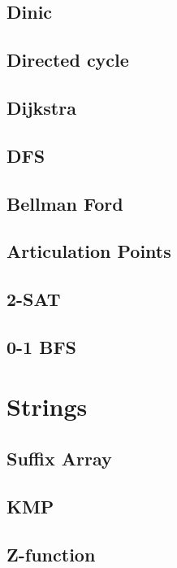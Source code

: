 \documentclass[10pt]{extarticle}
\begin{document}
\begin{multicols*}{3}
    \subsection{Dinic}
    
    \subsection{Directed cycle}
    
    \subsection{Dijkstra}
    
    \subsection{DFS}
    
    \subsection{Bellman Ford}
    
    \subsection{Articulation Points}
    
    \subsection{2-SAT}
    
    \subsection{0-1 BFS}
    

\section{Strings}

\subsection{Suffix Array}

\subsection{KMP}

\subsection{Z-function}



\end{multicols*}
\end{document}
